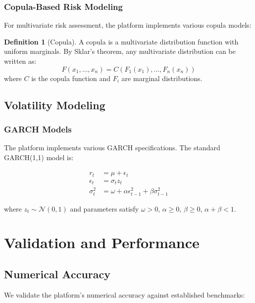\documentclass[12pt,a4paper]{article}
\theoremstyle{definition}
\newtheorem{definition}[theorem]{Definition}
\theoremstyle{remark}
\begin{document}
\subsubsection{Copula-Based Risk Modeling}

For multivariate risk assessment, the platform implements various copula models:

\begin{definition}[Copula]
A copula is a multivariate distribution function with uniform marginals. By Sklar's theorem, any multivariate distribution can be written as:
\begin{equation}
F(x_1, \ldots, x_n) = C(F_1(x_1), \ldots, F_n(x_n))
\end{equation}
where $C$ is the copula function and $F_i$ are marginal distributions.
\end{definition}

\subsection{Volatility Modeling}

\subsubsection{GARCH Models}

The platform implements various GARCH specifications. The standard GARCH(1,1) model is:

\begin{align}
r_t &= \mu + \epsilon_t \\
\epsilon_t &= \sigma_t z_t \\
\sigma_t^2 &= \omega + \alpha \epsilon_{t-1}^2 + \beta \sigma_{t-1}^2
\end{align}

where $z_t \sim \mathcal{N}(0,1)$ and parameters satisfy $\omega > 0$, $\alpha \geq 0$, $\beta \geq 0$, $\alpha + \beta < 1$.

\section{Validation and Performance}

\subsection{Numerical Accuracy}

We validate the platform's numerical accuracy against established benchmarks:
\end{document}
